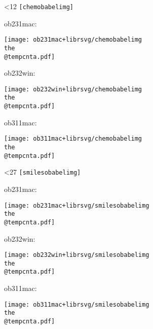 \documentclass{article}
\begin{document}
\centering

\makeatletter
{}
\loop\ifnum\@tempcnta<12\relax
  \advance\@tempcnta\@ne
  \texttt{[chemobabelimg\the\@tempcnta]}\par
  ob231mac:\par
  \texttt{[image: ob231mac+librsvg/chemobabelimg\\the\\@tempcnta.pdf]}\par
  ob232win:\par
  \texttt{[image: ob232win+librsvg/chemobabelimg\\the\\@tempcnta.pdf]}\par
  ob311mac:\par
  \texttt{[image: ob311mac+librsvg/chemobabelimg\\the\\@tempcnta.pdf]}\par
  \newpage
\repeat
{}
\loop\ifnum\@tempcnta<27\relax
  \advance\@tempcnta\@ne
  \texttt{[smilesobabelimg\the\@tempcnta]}\par
  ob231mac:\par
  \texttt{[image: ob231mac+librsvg/smilesobabelimg\\the\\@tempcnta.pdf]}\par
  ob232win:\par
  \texttt{[image: ob232win+librsvg/smilesobabelimg\\the\\@tempcnta.pdf]}\par
  ob311mac:\par
  \texttt{[image: ob311mac+librsvg/smilesobabelimg\\the\\@tempcnta.pdf]}\par
  \newpage
\repeat
\makeatother
\end{document}
